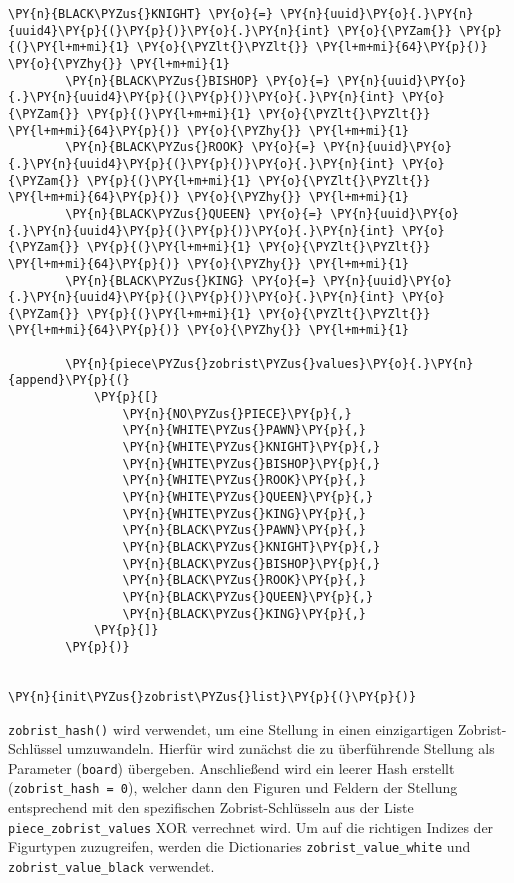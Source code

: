 \begin{tcolorbox}[fontupper=\linespread{.66}\selectfont, breakable, size=fbox, boxrule=1pt, pad at break*=1mm,colback=cellbackground, colframe=cellborder]
\begin{Verbatim}[commandchars=\\\{\}]
        \PY{n}{BLACK\PYZus{}KNIGHT} \PY{o}{=} \PY{n}{uuid}\PY{o}{.}\PY{n}{uuid4}\PY{p}{(}\PY{p}{)}\PY{o}{.}\PY{n}{int} \PY{o}{\PYZam{}} \PY{p}{(}\PY{l+m+mi}{1} \PY{o}{\PYZlt{}\PYZlt{}} \PY{l+m+mi}{64}\PY{p}{)} \PY{o}{\PYZhy{}} \PY{l+m+mi}{1}
        \PY{n}{BLACK\PYZus{}BISHOP} \PY{o}{=} \PY{n}{uuid}\PY{o}{.}\PY{n}{uuid4}\PY{p}{(}\PY{p}{)}\PY{o}{.}\PY{n}{int} \PY{o}{\PYZam{}} \PY{p}{(}\PY{l+m+mi}{1} \PY{o}{\PYZlt{}\PYZlt{}} \PY{l+m+mi}{64}\PY{p}{)} \PY{o}{\PYZhy{}} \PY{l+m+mi}{1}
        \PY{n}{BLACK\PYZus{}ROOK} \PY{o}{=} \PY{n}{uuid}\PY{o}{.}\PY{n}{uuid4}\PY{p}{(}\PY{p}{)}\PY{o}{.}\PY{n}{int} \PY{o}{\PYZam{}} \PY{p}{(}\PY{l+m+mi}{1} \PY{o}{\PYZlt{}\PYZlt{}} \PY{l+m+mi}{64}\PY{p}{)} \PY{o}{\PYZhy{}} \PY{l+m+mi}{1}
        \PY{n}{BLACK\PYZus{}QUEEN} \PY{o}{=} \PY{n}{uuid}\PY{o}{.}\PY{n}{uuid4}\PY{p}{(}\PY{p}{)}\PY{o}{.}\PY{n}{int} \PY{o}{\PYZam{}} \PY{p}{(}\PY{l+m+mi}{1} \PY{o}{\PYZlt{}\PYZlt{}} \PY{l+m+mi}{64}\PY{p}{)} \PY{o}{\PYZhy{}} \PY{l+m+mi}{1}
        \PY{n}{BLACK\PYZus{}KING} \PY{o}{=} \PY{n}{uuid}\PY{o}{.}\PY{n}{uuid4}\PY{p}{(}\PY{p}{)}\PY{o}{.}\PY{n}{int} \PY{o}{\PYZam{}} \PY{p}{(}\PY{l+m+mi}{1} \PY{o}{\PYZlt{}\PYZlt{}} \PY{l+m+mi}{64}\PY{p}{)} \PY{o}{\PYZhy{}} \PY{l+m+mi}{1}

        \PY{n}{piece\PYZus{}zobrist\PYZus{}values}\PY{o}{.}\PY{n}{append}\PY{p}{(}
            \PY{p}{[}
                \PY{n}{NO\PYZus{}PIECE}\PY{p}{,}
                \PY{n}{WHITE\PYZus{}PAWN}\PY{p}{,}
                \PY{n}{WHITE\PYZus{}KNIGHT}\PY{p}{,}
                \PY{n}{WHITE\PYZus{}BISHOP}\PY{p}{,}
                \PY{n}{WHITE\PYZus{}ROOK}\PY{p}{,}
                \PY{n}{WHITE\PYZus{}QUEEN}\PY{p}{,}
                \PY{n}{WHITE\PYZus{}KING}\PY{p}{,}
                \PY{n}{BLACK\PYZus{}PAWN}\PY{p}{,}
                \PY{n}{BLACK\PYZus{}KNIGHT}\PY{p}{,}
                \PY{n}{BLACK\PYZus{}BISHOP}\PY{p}{,}
                \PY{n}{BLACK\PYZus{}ROOK}\PY{p}{,}
                \PY{n}{BLACK\PYZus{}QUEEN}\PY{p}{,}
                \PY{n}{BLACK\PYZus{}KING}\PY{p}{,}
            \PY{p}{]}
        \PY{p}{)}


\PY{n}{init\PYZus{}zobrist\PYZus{}list}\PY{p}{(}\PY{p}{)}
\end{Verbatim}
\end{tcolorbox}

    \texttt{zobrist\_hash()} wird verwendet, um eine Stellung in einen
einzigartigen Zobrist-Schlüssel umzuwandeln. Hierfür wird zunächst die
zu überführende Stellung als Parameter (\texttt{board}) übergeben.
Anschließend wird ein leerer Hash erstellt
(\texttt{zobrist\_hash\ =\ 0}), welcher dann den Figuren und Feldern der
Stellung entsprechend mit den spezifischen Zobrist-Schlüsseln aus der
Liste \texttt{piece\_zobrist\_values} XOR verrechnet wird. Um auf die
richtigen Indizes der Figurtypen zuzugreifen, werden die Dictionaries
\texttt{zobrist\_value\_white} und \texttt{zobrist\_value\_black}
verwendet.

